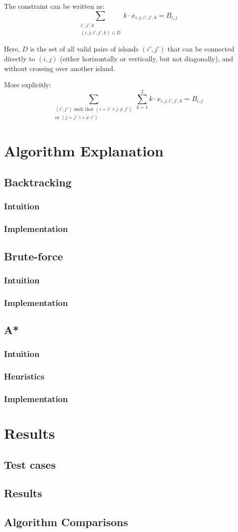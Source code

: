 \documentclass[12pt, a4paper]{article}
\begin{document}
The constraint can be written as:
\[
\sum_{\substack{i',j',k \\ (i,j,i',j',k) \in D}} k \cdot x_{i,j,i',j',k} = B_{i,j}
\]

Here, $D$ is the set of all valid pairs of islands $(i',j')$ that can be connected directly to $(i,j)$ (either horizontally or vertically, but not diagonally), and without crossing over another island.

More explicitly:
\[
\sum_{\substack{(i',j') \text{ such that } (i = i' \land j \ne j') \\ \text{or } (j = j' \land i \ne i')}} \sum_{k=1}^{2} k \cdot x_{i,j,i',j',k} = B_{i,j}
\]
\section{Algorithm Explanation}
\subsection{Backtracking}
\subsubsection{Intuition}
\subsubsection{Implementation}
\subsection{Brute-force}
\subsubsection{Intuition}
\subsubsection{Implementation}
\subsection{A*}
\subsubsection{Intuition}
\subsubsection{Heuristics}
\subsubsection{Implementation}
\section{Results}
\subsection{Test cases}
\subsection{Results}
\subsection{Algorithm Comparisons}
\end{document}
